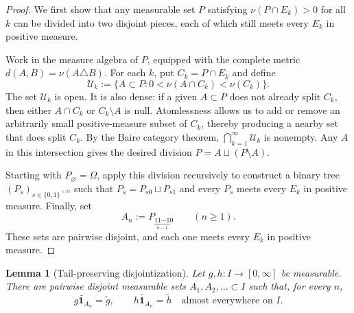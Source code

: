 \documentclass[11pt]{article}
\newtheorem{lemma}[theorem]{Lemma}
\theoremstyle{remark}
\newcommand{\one}{\mathbf 1}
\begin{document}
\begin{proof}
We first show that any measurable set $P$ satisfying
$\nu(P\cap E_k)>0$ for all $k$ can be divided into two disjoint pieces, each
of which still meets every $E_k$ in positive measure.

Work in the measure algebra of $P$, equipped with the complete metric
$d(A,B)=\nu(A\triangle B)$.  For each $k$, put $C_k=P\cap E_k$ and define
\[
 \mathcal U_k:=\bigl\{A\subset P:
        0<\nu(A\cap C_k)<\nu(C_k)\bigr\}.
\]
The set $\mathcal U_k$ is open.  It is also dense: if a given $A\subset P$
does not already split $C_k$, then either $A\cap C_k$ or $C_k\setminus A$ is
null.  Atomlessness allows us to add or remove an arbitrarily small
positive-measure subset of $C_k$, thereby producing a nearby set that does
split $C_k$.  By the Baire category theorem,
$\bigcap_{k=1}^\infty\mathcal U_k$ is nonempty.  Any $A$ in this intersection
gives the desired division $P=A\sqcup(P\setminus A)$.

Starting with $P_\varnothing=\Omega$, apply this division recursively to
construct a binary tree $(P_s)_{s\in\{0,1\}^{<\mathbb N}}$ such that
$P_s=P_{s0}\sqcup P_{s1}$ and every $P_s$ meets every $E_k$ in positive
measure.  Finally, set
\[
 A_n:=P_{\underbrace{11\cdots1}_{n-1}0}\qquad(n\geq1).
\]
These sets are pairwise disjoint, and each one meets every $E_k$ in positive
measure.
\end{proof}

\begin{lemma}[Tail-preserving disjointization]\label{lem:tail}
Let $g,h:I\to[0,\infty]$ be measurable.  There are pairwise disjoint
measurable sets $A_1,A_2,\ldots\subset I$ such that, for every $n$,
\begin{equation}\label{eq:tail-preserve}
 \widetilde{g\one_{A_n}}=\widetilde g,
 \qquad
 \widetilde{h\one_{A_n}}=\widetilde h
 \quad\text{almost everywhere on }I.
\end{equation}
\end{lemma}
\end{document}
